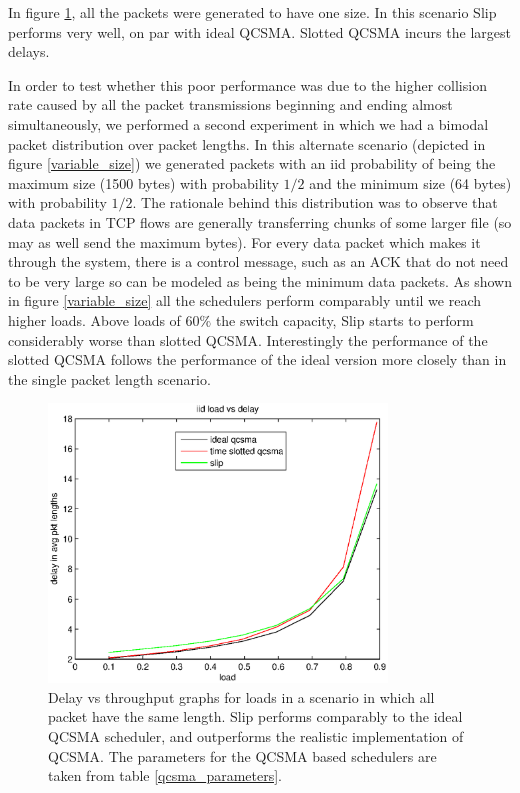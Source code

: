 \documentclass{IEEEtran}%
\begin{document}
In figure \ref{one_size}, all the packets were generated to have one size.  In this scenario Slip performs very well, on par with ideal QCSMA.  Slotted QCSMA incurs the largest delays.

In order to test whether this poor performance was due to the higher collision rate caused by all the packet transmissions beginning and ending almost simultaneously, we performed a second experiment in which we had a bimodal packet distribution over packet lengths.  In this alternate scenario (depicted in figure \ref{variable_size}) we generated packets with an iid probability of being the maximum size (1500 bytes) with probability $1/2$ and the minimum size (64 bytes) with probability $1/2$.  The rationale behind this distribution was to observe that data packets in TCP flows are generally transferring chunks of some larger file (so may as well send the maximum bytes).  For every data packet which makes it through the system, there is a control message, such as an ACK that do not need to be very large so can be modeled as being the minimum data packets.  As shown in figure \ref{variable_size} all the schedulers perform comparably until we reach higher loads.  Above loads of $60\%$ the switch capacity, Slip starts to perform considerably worse than slotted QCSMA.  Interestingly the performance of the slotted QCSMA follows the performance of the ideal version more closely than in the single packet length scenario.

\begin{figure}%
	 \includegraphics[width=90mm]{us_load.eps}
	\caption{Delay vs throughput graphs for loads in a scenario in which all packet have the same length.  Slip performs comparably to the ideal QCSMA scheduler, and outperforms the realistic implementation of QCSMA.  The parameters for the QCSMA based schedulers are taken from table \ref{qcsma_parameters}.} 	
	\label{one_size}
\end{figure}
\end{document}
